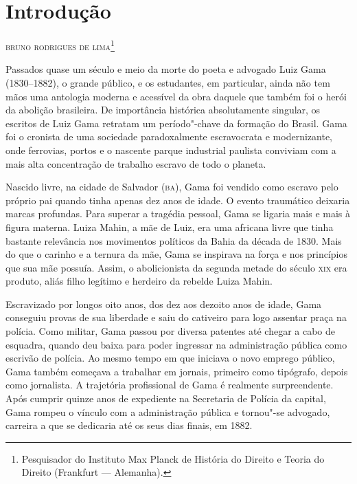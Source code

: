 \chapter{Introdução}

\begin{flushright}
\textsc{bruno rodrigues de lima}\footnote[*]{Pesquisador do Instituto Max Planck de História do Direito e Teoria do
Direito (Frankfurt --- Alemanha).}
\end{flushright}
\bigskip


\noindent{}Passados quase um século e meio da morte do poeta e advogado Luiz Gama
(1830--1882), o grande público, e os estudantes, em particular, ainda não
tem mãos uma antologia moderna e acessível da obra daquele que também
foi o herói da abolição brasileira. De importância histórica
absolutamente singular, os escritos de Luiz Gama retratam um
período"-chave da formação do Brasil. Gama foi o cronista de uma
sociedade paradoxalmente escravocrata e modernizante, onde ferrovias,
portos e o nascente parque industrial paulista conviviam com a mais
alta concentração de trabalho escravo de todo o planeta.

Nascido livre, na cidade de Salvador (\textsc{ba}), Gama foi vendido como escravo
pelo próprio pai quando tinha apenas dez anos de idade. O evento
traumático deixaria marcas profundas. Para superar a tragédia pessoal,
Gama se ligaria mais e mais à figura materna. Luiza Mahin, a mãe de
Luiz, era uma africana livre que tinha bastante relevância nos
movimentos políticos da Bahia da década de 1830. Mais do que o carinho e
a ternura da mãe, Gama se inspirava na força e nos princípios que sua
mãe possuía. Assim, o abolicionista da segunda metade do século \textsc{xix} era
produto, aliás filho legítimo e herdeiro da rebelde Luiza Mahin.

Escravizado por longos oito anos, dos dez aos dezoito anos de idade,
Gama conseguiu provas de sua liberdade e saiu do cativeiro para logo
assentar praça na polícia. Como militar, Gama passou por diversa
patentes até chegar a cabo de esquadra, quando deu baixa para poder
ingressar na administração pública como escrivão de polícia. Ao mesmo
tempo em que iniciava o novo emprego público, Gama também começava a
trabalhar em jornais, primeiro como tipógrafo, depois como jornalista. A
trajetória profissional de Gama é realmente surpreendente. Após cumprir
quinze anos de expediente na Secretaria de Polícia da capital, Gama
rompeu o vínculo com a administração pública e tornou"-se advogado,
carreira a que se dedicaria até os seus dias finais, em 1882.

